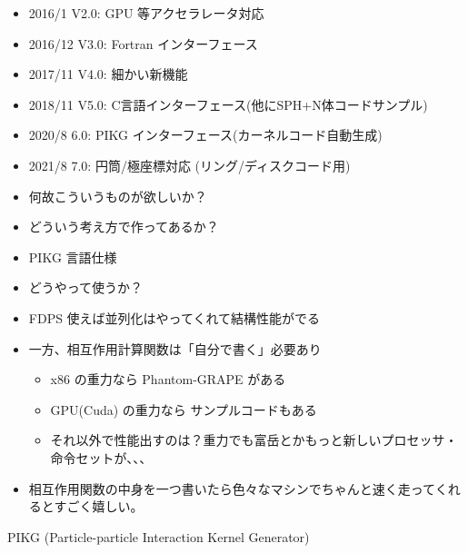 \documentclass[12pt,dvipdfmx]{article}
\begin{document}
\begin{itemize}

\item  2016/1 V2.0: GPU 等アクセラレータ対応
\item  2016/12 V3.0: Fortran インターフェース
\item  2017/11 V4.0: 細かい新機能
\item  2018/11 V5.0: C言語インターフェース(他にSPH+N体コードサンプル)
\item  2020/8 6.0: PIKG インターフェース(カーネルコード自動生成)
\item  2021/8 7.0: 円筒/極座標対応 (リング/ディスクコード用)







\end{itemize}
\begin{itemize}

\item 何故こういうものが欲しいか？

\item どういう考え方で作ってあるか？

\item PIKG 言語仕様

\item どうやって使うか？

\end{itemize}



\begin{itemize}

\item FDPS 使えば並列化はやってくれて結構性能がでる

\item 一方、相互作用計算関数は「自分で書く」必要あり
\begin{itemize}
\item x86 の重力なら Phantom-GRAPE がある
\item GPU(Cuda) の重力なら サンプルコードもある
\item それ以外で性能出すのは？重力でも富岳とかもっと新しいプロセッサ・
命令セットが、、、 
\end{itemize}
\item 相互作用関数の中身を一つ書いたら色々なマシンでちゃんと速く走ってくれるとすごく嬉しい。
\end{itemize}

PIKG (Particle-particle Interaction Kernel Generator)
\end{document}
